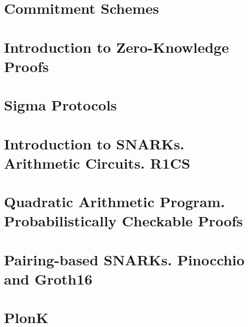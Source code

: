\documentclass{zkdl-template-105x135-nohead}
\begin{document}
    

    \section{Commitment Schemes} \label{section:commitments}

     

    \section{Introduction to Zero-Knowledge Proofs} \label{section:intro-zk}

    

    \section{Sigma Protocols} \label{section:sigma}

    

    \section[Arithmetic Circuits. R1CS]{Introduction to SNARKs. Arithmetic Circuits. R1CS} \label{section:r1cs}

    \label{secation:circuits}

    \section[Quadratic Arithmetic Program]{Quadratic Arithmetic Program. Probabilistically Checkable Proofs} \label{section:qap}

    

    \section[Pairing-based SNARKs]{Pairing-based SNARKs. Pinocchio and Groth16} \label{section:groth16}

    

    \section{PlonK} \label{section:plonk}

    


    
    
    
    
\end{document}
